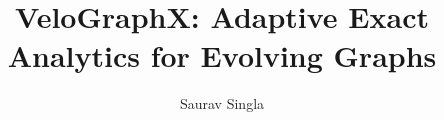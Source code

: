 \documentclass[sigconf, nonacm]{acmart}
\begin{document}
\title{VeloGraphX: Adaptive Exact Analytics for Evolving Graphs}

\author{Saurav Singla}

\begin{abstract}

\end{abstract}

\maketitle

\vldbtopmatter



\label{vldb-content-end}



\end{document}
